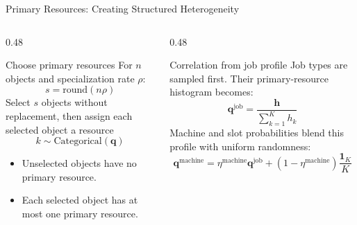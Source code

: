 \documentclass[aspectratio=169,10pt]{beamer}
\begin{document}
\begin{frame}{Primary Resources: Creating Structured Heterogeneity}
  \begin{columns}[T,totalwidth=\textwidth]
    \begin{column}{0.48\textwidth}
      \begin{block}{Choose primary resources}
        For $n$ objects and specialization rate $\rho$:
        \[
          s=\mathrm{round}(n\rho)
        \]
        Select $s$ objects without replacement, then assign each selected object a resource
        \[
          k\sim\mathrm{Categorical}(\mathbf{q})
        \]
      \end{block}
      \begin{itemize}
        \item Unselected objects have no primary resource.
        \item Each selected object has at most one primary resource.
      \end{itemize}
    \end{column}
    \begin{column}{0.48\textwidth}
      \begin{block}{Correlation from job profile}
        Job types are sampled first. Their primary-resource histogram becomes:
        \[
          \mathbf{q}^{\mathrm{job}}
          =
          \frac{\mathbf{h}}{\sum_{k=1}^{K}h_k}
        \]
        Machine and slot probabilities blend this profile with uniform randomness:
        \[
          \mathbf{q}^{\mathrm{machine}}
          =
          \eta^{\mathrm{machine}}\mathbf{q}^{\mathrm{job}}
          +(1-\eta^{\mathrm{machine}})\frac{\mathbf{1}_K}{K}
        \]
      \end{block}
    \end{column}
  \end{columns}
\end{frame}
\end{document}
